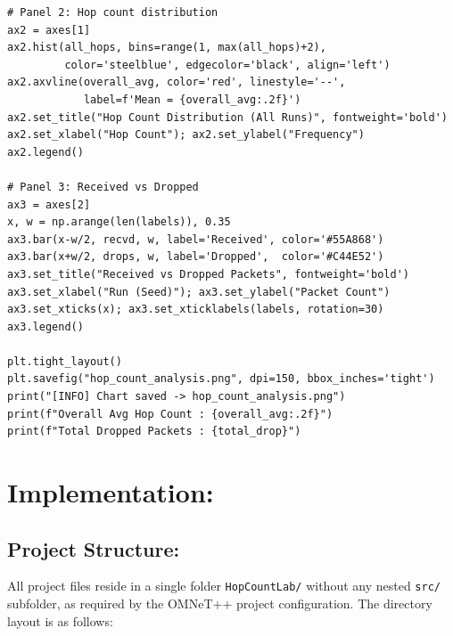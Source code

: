 \documentclass[12pt,a4paper]{article}
\begin{document}
\begin{lstlisting}[style=pystyle, caption={analyze\_results.py -- Statistics and 3-panel visualization}]
# Panel 2: Hop count distribution
ax2 = axes[1]
ax2.hist(all_hops, bins=range(1, max(all_hops)+2),
         color='steelblue', edgecolor='black', align='left')
ax2.axvline(overall_avg, color='red', linestyle='--',
            label=f'Mean = {overall_avg:.2f}')
ax2.set_title("Hop Count Distribution (All Runs)", fontweight='bold')
ax2.set_xlabel("Hop Count"); ax2.set_ylabel("Frequency")
ax2.legend()

# Panel 3: Received vs Dropped
ax3 = axes[2]
x, w = np.arange(len(labels)), 0.35
ax3.bar(x-w/2, recvd, w, label='Received', color='#55A868')
ax3.bar(x+w/2, drops, w, label='Dropped',  color='#C44E52')
ax3.set_title("Received vs Dropped Packets", fontweight='bold')
ax3.set_xlabel("Run (Seed)"); ax3.set_ylabel("Packet Count")
ax3.set_xticks(x); ax3.set_xticklabels(labels, rotation=30)
ax3.legend()

plt.tight_layout()
plt.savefig("hop_count_analysis.png", dpi=150, bbox_inches='tight')
print("[INFO] Chart saved -> hop_count_analysis.png")
print(f"Overall Avg Hop Count : {overall_avg:.2f}")
print(f"Total Dropped Packets : {total_drop}")
\end{lstlisting}

\section{Implementation: }

\subsection{Project Structure: }

\justifying
All project files reside in a single folder \texttt{HopCountLab/} without any nested \texttt{src/} subfolder, as required by the OMNeT++ project configuration. The directory layout is as follows:
\end{document}
